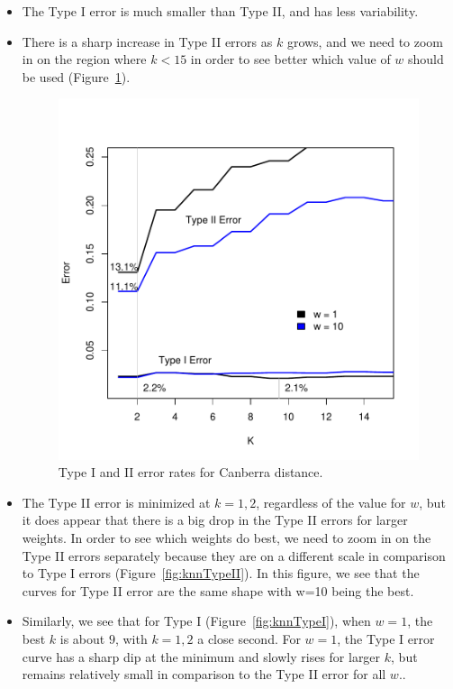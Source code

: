 \begin{itemize}
\item The Type I error is much smaller than Type II, and has less variability.

\item There is a sharp increase in Type II errors as $k$ grows, and we need to
zoom in on the region where $k< 15$ in order to see better which value of 
$w$ should be used (Figure~\ref{fig:knn1to15}).

\begin{figure}
\includegraphics{Spam/knn1to15.pdf}
\caption{Type I and II error rates for Canberra distance.}
\label{fig:knn1to15}
\end{figure}

\item The Type II error is minimized at $k=1, 2$, regardless of the value for $w$,
but it does appear that there is a big drop in the Type II errors for larger weights.
In order to see which weights do best, we need to zoom in on the Type II errors 
separately because they are on a different scale in comparison to Type I errors
(Figure~\ref{fig:knnTypeII}).
In this figure, we see that the curves for Type II error
are the same shape with w=10 being the best.

\item Similarly, we see that for Type I (Figure~\ref{fig:knnTypeI}), 
when $w=1$, the best $k$ is about $9$, with $k=1,2$ a close second. 
For $w = 1$, the Type I error curve has a sharp dip at the minimum
and slowly rises for larger $k$, but remains relatively small in
comparison to the Type II error for all $w$..
\end{itemize}

